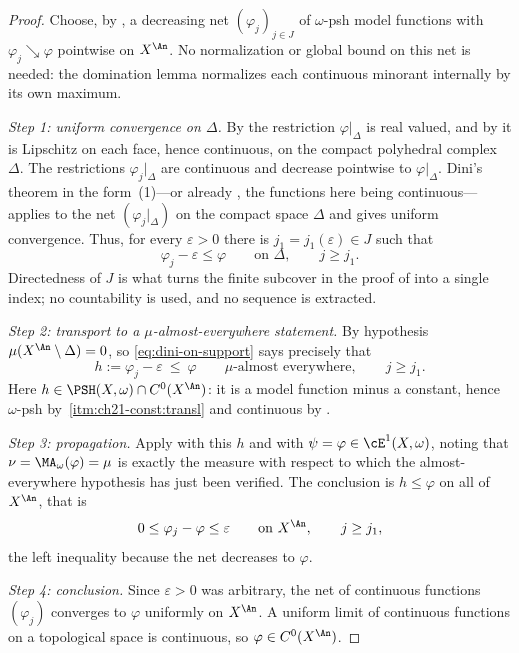 \begin{proof}
Choose, by , a decreasing net
$(\varphi_j)_{j\in J}$ of $\omega$-psh model functions with
$\varphi_j\searrow\varphi$ pointwise on $X^{\An}$.  No normalization or
global bound on this net is needed: the domination lemma normalizes each
continuous minorant internally by its own maximum.

\emph{Step 1: uniform convergence on $\Delta$.}  By
 the restriction
$\varphi|_\Delta$ is real valued, and by
 it is Lipschitz on each face, hence
continuous, on the compact polyhedral complex $\Delta$.  The restrictions
$\varphi_j|_\Delta$ are continuous and decrease pointwise to
$\varphi|_\Delta$.  Dini's theorem in the form
\,(1)---or already
, the functions here being continuous---applies to the
net $(\varphi_j|_\Delta)$ on the compact space $\Delta$ and gives
uniform convergence.  Thus, for every $\varepsilon>0$ there is
$j_1=j_1(\varepsilon)\in J$ such that
\begin{equation}
\label{eq:dini-on-support}
                    \varphi_j-\varepsilon\leq\varphi
                    \qquad\text{on }\Delta,\qquad j\geq j_1 .
\end{equation}
Directedness of $J$ is what turns the finite subcover in the proof of
 into a single index; no countability is used, and no
sequence is extracted.

\emph{Step 2: transport to a $\mu$-almost-everywhere statement.}  By
hypothesis $\mu(X^{\An}\setminus\Delta)=0$, so
\eqref{eq:dini-on-support} says precisely that
\[
 h:=\varphi_j-\varepsilon\ \leq\ \varphi
 \qquad\mu\text{-almost everywhere},\qquad j\geq j_1 .
\]
Here $h\in\PSH(X,\omega)\cap C^0(X^{\An})$: it is a model function minus a
constant, hence $\omega$-psh by
\,\cref{itm:ch21-const:transl} and continuous by
.

\emph{Step 3: propagation.}  Apply  with
this $h$ and with $\psi=\varphi\in\cE^1(X,\omega)$, noting that
$\nu=\MA_\omega(\varphi)=\mu$ is exactly the measure with respect to which
the almost-everywhere hypothesis has just been verified.  The conclusion is
$h\leq\varphi$ on all of $X^{\An}$, that is
\[
                  0\leq\varphi_j-\varphi\leq\varepsilon
                  \qquad\text{on }X^{\An},\qquad j\geq j_1 ,
\]
the left inequality because the net decreases to $\varphi$.

\emph{Step 4: conclusion.}  Since $\varepsilon>0$ was arbitrary, the net
of continuous functions $(\varphi_j)$ converges to $\varphi$ uniformly
on $X^{\An}$.  A uniform limit of continuous functions on a topological
space is continuous, so $\varphi\in C^0(X^{\An})$.
\end{proof}

